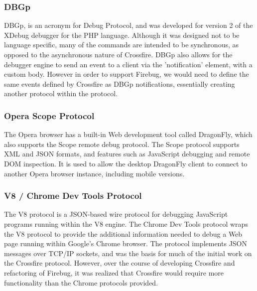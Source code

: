 \subsubsection{DBGp}
DBGp\cite{dbgp}, is an acronym for Debug Protocol, and was developed for version
2 of the XDebug debugger for the PHP language. Although it was designed not to
be language specific, many of the commands are intended to be synchronous, as
opposed to the asynchronous nature of Crossfire. DBGp also allows for the
debugger engine to send an event to a client via the 'notification' element,
with a custom body. However in order to support Firebug, we would need to define
the same events defined by Crossfire as DBGp notifications, essentially creating
another protocol within the protocol.

\subsubsection{Opera Scope Protocol}
The Opera browser has a built-in Web development tool called DragonFly, which
also supports the Scope remote debug protocol. The Scope
protocol\cite{opera-scope} supports XML and JSON formats, and features such as
JavaScript debugging and remote DOM inspection. It is used to allow the desktop
DragonFly client to connect to another Opera browser instance, including mobile
versions.

\subsubsection{V8 / Chrome Dev Tools Protocol}
The V8 protocol\cite{v8} is a JSON-based wire protocol for debugging JavaScript
programs running within the V8 engine. The Chrome Dev Tools
protocol\cite{chrome-dev-tools} wraps the V8 protocol to provide the additional
information needed to debug a Web page running within Google's Chrome browser.
The protocol implements JSON messages over TCP/IP sockets, and was the basis for
much of the initial work on the Crossfire protocol. However, over the course of
developing Crossfire and refactoring of Firebug, it was realized that Crossfire
would require more functionality than the Chrome protocols provided.


